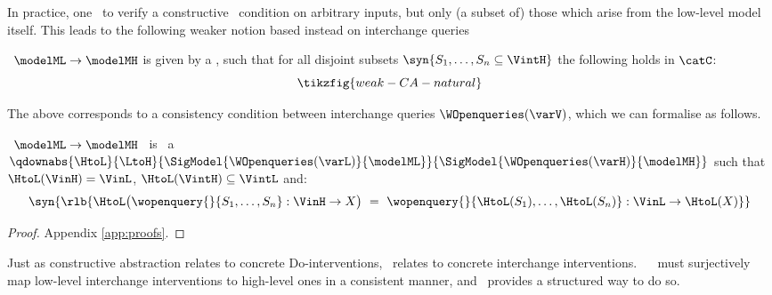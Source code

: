 \documentclass{article}
\begin{document}
In practice, one \ to verify a constructive \ condition on arbitrary inputs, but only (a subset of) those which arise from the low-level model itself. This leads to the following weaker notion based instead on interchange queries   

\begin{definition}[\rl{\restrictedCCAcaps}]
\ $\modelML \to \modelMH$ is given by a \rl{\varalign\ $\dvaralign{\HtoL}{\LtoH}{\modelVL}{\modelVH}$}, such that for all disjoint subsets $\syn{S_1,\dots,S_n \subseteq \VintH}$ the following holds in $\catC$:
\begin{equation} \label{eq:weak-CA-natural}
\tikzfig{weak-CA-natural}
\end{equation}
\end{definition}

The above corresponds to a consistency condition between interchange queries $\WOpenqueries(\varV)$, which we can formalise as follows.


\begin{proposition} \label{prop:interchange-queries}
\ 
$\modelML \to \modelMH$ 
\ 
is \  
a \qdown{}  
$\qdownabs{\HtoL}{\LtoH}{\SigModel{\WOpenqueries(\varL)}{\modelML}}{\SigModel{\WOpenqueries(\varH)}{\modelMH}}$ 
such that $\HtoL(\VinH) = \VinL$, 
$\HtoL(\VintH) \subseteq \VintL$ and: 
\begin{equation} \label{eq:weakCA-query-map}
\syn{
\rlb{\HtoL \big( \wopenquery{}{S_1,\dots,S_n} : \VinH \to X \big) \ = \ \wopenquery{}{\HtoL(S_1),\dots,\HtoL(S_n)} : \VinL \to \HtoL(X)}
}
\end{equation}
\end{proposition}

\begin{proof}
Appendix \ref{app:proofs}.
\end{proof}


Just as constructive abstraction relates to concrete Do-interventions, \rl{\restrictedCCA}\ relates to concrete interchange interventions. \ \qup{} \rl{$\qupabsshort{\SigModel{\II(\modelVL)}{\modelML}}{\SigModel{\II(\modelVH)}{\modelMH}}$}\ must surjectively map low-level interchange interventions to high-level ones in a consistent manner, and \rl{\restrictedCCA}\ provides a structured way to do so. 
\end{document}
